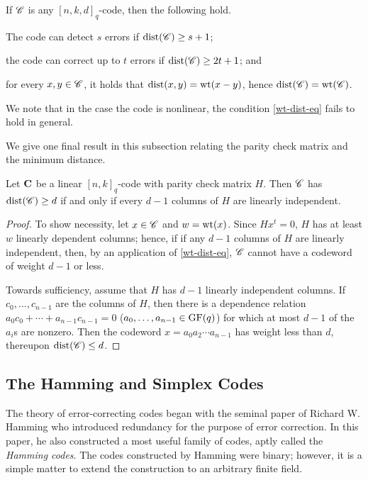 \documentclass[../../../main]{subfiles}
\begin{document}
\begin{prop}
 If $\mathscr{C}$ is any $[n,k,d]_q$-code, then the following hold.
 \begin{defenum}
  \item The code can detect $s$ errors if $\text{dist}(\mathscr{C}) \geq s+1$;
  \item\label{distance} the code can correct up to $t$ errors if $\text{dist}(\mathscr{C}) \geq 2t+1$; and
  \item\label{wt-dist-eq} for every $x,y \in \mathscr{C}$, it holds that $\text{dist}(x,y) = \text{wt}(x-y)$, hence $\text{dist}(\mathscr{C})=\text{wt}(\mathscr{C})$.
 \end{defenum}
\end{prop}

We note that in the case the code is nonlinear, the condition \ref{wt-dist-eq} fails to hold in general.

We give one final result in this subsection relating the parity check matrix and the minimum distance.

\begin{prop}\label{dist-parity}
 Let $\mathbf{C}$ be a linear $[n,k]_q$-code with parity check matrix $H$. Then $\mathscr{C}$ has $\text{dist}(\mathscr{C}) \geq d$ if and only if every $d-1$ columns of $H$ are linearly independent.
\end{prop}

\begin{proof}
 To show necessity, let $x \in \mathscr{C}$ and $w = \text{wt}(x)$. Since $Hx^t=0$, $H$ has at least $w$ linearly dependent columns; hence, if if any $d-1$ columns of $H$ are linearly independent, then, by an application of \ref{wt-dist-eq}, $\mathscr{C}$ cannot have a codeword of weight $d-1$ or less. 
 
 Towards sufficiency, assume that $H$ has $d-1$ linearly independent columns. If $c_0, \dots, c_{n-1}$ are the columns of $H$, then there is a dependence relation $a_0c_0 + \cdots + a_{n-1}c_{n-1} = 0$ ($a_0, \dots, a_{n-1} \in \text{GF}(q)$) for which at most $d-1$ of the $a_i$s are nonzero. Then the codeword $x=a_0a_2 \cdots a_{n-1}$ has weight less than $d$, thereupon $\text{dist}(\mathscr{C}) \leq d$. 
\end{proof}

\dinkus

\subsection{The Hamming and Simplex Codes}

The theory of error-correcting codes began with the seminal paper of Richard W. Hamming \citeyearpar{richard-hamming} who introduced redundancy for the purpose of error correction. In this paper, he also constructed a most useful family of codes, aptly called the {\it Hamming codes}. The codes constructed by Hamming were binary; however, it is a simple matter to extend the construction to an arbitrary finite field.
\end{document}
